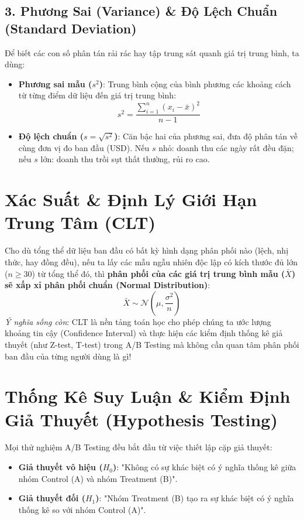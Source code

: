 \subsection{3. Phương Sai (Variance) \& Độ Lệch Chuẩn (Standard Deviation)}
Để biết các con số phân tán rải rác hay tập trung sát quanh giá trị trung bình, ta dùng:
\begin{itemize}
    \item \textbf{Phương sai mẫu ($s^2$)}: Trung bình cộng của bình phương các khoảng cách từ từng điểm dữ liệu đến giá trị trung bình:
    \[
    s^2 = \frac{\sum_{i=1}^{n} (x_i - \bar{x})^2}{n - 1}
    \]
    \item \textbf{Độ lệch chuẩn ($s = \sqrt{s^2}$)}: Căn bậc hai của phương sai, đưa độ phân tán về cùng đơn vị đo ban đầu (USD). Nếu $s$ nhỏ: doanh thu các ngày rất đều đặn; nếu $s$ lớn: doanh thu trồi sụt thất thường, rủi ro cao.
\end{itemize}

\section{Xác Suất \& Định Lý Giới Hạn Trung Tâm (CLT)}

\begin{lythuyetbox}
Cho dù tổng thể dữ liệu ban đầu có bất kỳ hình dạng phân phối nào (lệch, nhị thức, hay đồng đều), nếu ta lấy các mẫu ngẫu nhiên độc lập có kích thước đủ lớn ($n \ge 30$) từ tổng thể đó, thì \textbf{phân phối của các giá trị trung bình mẫu ($\bar{X}$) sẽ xấp xỉ phân phối chuẩn (Normal Distribution)}:
\[
\bar{X} \sim \mathcal{N}\left(\mu, \frac{\sigma^2}{n}\right)
\]
\textit{Ý nghĩa sống còn}: CLT là nền tảng toán học cho phép chúng ta ước lượng khoảng tin cậy (Confidence Interval) và thực hiện các kiểm định thống kê giả thuyết (như Z-test, T-test) trong A/B Testing mà không cần quan tâm phân phối ban đầu của từng người dùng là gì!
\end{lythuyetbox}

\section{Thống Kê Suy Luận \& Kiểm Định Giả Thuyết (Hypothesis Testing)}

Mọi thử nghiệm A/B Testing đều bắt đầu từ việc thiết lập cặp giả thuyết:
\begin{itemize}
    \item \textbf{Giả thuyết vô hiệu ($H_0$)}: "Không có sự khác biệt có ý nghĩa thống kê giữa nhóm Control (A) và nhóm Treatment (B)".
    \item \textbf{Giả thuyết đối ($H_1$)}: "Nhóm Treatment (B) tạo ra sự khác biệt có ý nghĩa thống kê so với nhóm Control (A)".
\end{itemize}

